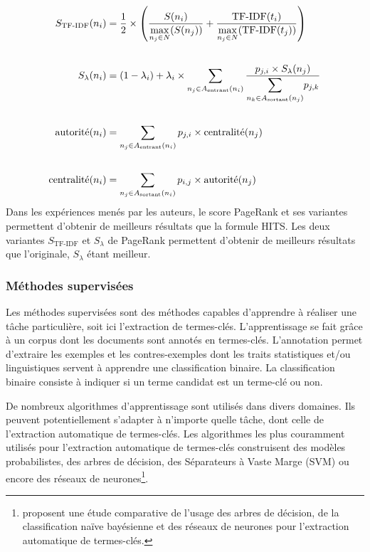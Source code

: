         \begin{align}
          S_{\text{TF-IDF}}(n_i) &= \frac{1}{2} \times \left(\frac{S(n_i)}{\mathlarger{\max}_{n_j \in N}(S(n_j))} + \frac{\text{TF-IDF}(t_i)}{\mathlarger{\max}_{n_j \in N}(\text{TF-IDF}(t_j))}\right) \label{math:apw}\\
          \notag\\
          S_{\lambda}(n_i) &= (1 - \lambda_i) + \lambda_i \times \sum_{n_j \in A_{\text{entrant}}(n_i)} \frac{p_{j, i} \times S_{\lambda}(n_j)}{\mathlarger{\sum}_{n_k \in A_{\text{sortant}}(n_j)} p_{j, k}} \label{math:ppr}\\
          \notag\\
          \text{autorité}(n_i) &= \sum_{n_j \in A_{\text{entrant}}(n_i)}p_{j, i} \times \text{centralité}(n_j) \label{math:hitsauthority}\\
          \notag\\
          \text{centralité}(n_i) &= \sum_{n_j \in A_{\text{sortant}}(n_i)}p_{i, j} \times \text{autorité}(n_j) \label{math:hitshub}
        \end{align}
        Dans les expériences menés par les auteurs, le score PageRank et ses
        variantes permettent d'obtenir de meilleurs résultats que la formule HITS.
        Les deux variantes $S_{\text{TF-IDF}}$ et $S_{\lambda}$ de PageRank
        permettent d'obtenir de meilleurs résultats que l'originale,
        $S_{\lambda}$ étant meilleur.

    \subsubsection{Méthodes supervisées}
    \label{sec:supervised_methods}
      Les méthodes supervisées sont des méthodes capables d'apprendre à réaliser
      une tâche particulière, soit ici l'extraction de termes-clés.
      L'apprentissage se fait grâce à un corpus dont les documents sont annotés en
      termes-clés. L'annotation permet d'extraire les exemples et les
      contres-exemples dont les traits statistiques et/ou linguistiques servent à
      apprendre une classification binaire. La classification binaire consiste à
      indiquer si un terme candidat est un terme-clé ou non.

      De nombreux algorithmes d'apprentissage sont utilisés dans divers domaines.
      Ils peuvent potentiellement s'adapter à n'importe quelle tâche, dont celle
      de l'extraction automatique de termes-clés. Les algorithmes les plus
      couramment utilisés pour l'extraction automatique de termes-clés
      construisent des modèles probabilistes, des arbres de décision, des
      Séparateurs à Vaste Marge (SVM) ou encore des réseaux de
      neurones\footnote{\citet{sarkar2012machinelearningcomparison} proposent une
      étude comparative de l'usage des arbres de décision, de la classification
      naïve bayésienne et des réseaux de neurones pour l'extraction automatique de
      termes-clés.}.


